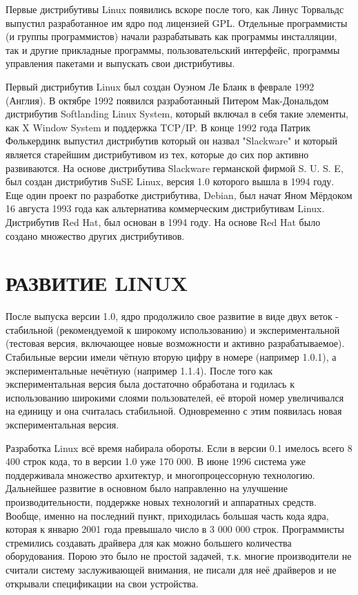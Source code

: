 \documentclass[bachelor, och, referat, times]{SCWorks}
\begin{document}
\par Первые дистрибутивы Linux появились вскоре 
после того, как Линус
Торвальдс выпустил разработанное им ядро под 
лицензией GPL. Отдельные 
программисты (и группы программистов) начали 
разрабатывать как программы 
инсталляции, так и другие прикладные программы, 
пользовательский 
интерфейс, программы управления пакетами и 
выпускать свои дистрибутивы.

\par Первый дистрибутив Linux был создан Оуэном Ле 
Бланк в феврале 1992 
(Англия). В октябре 1992 появился разработанный 
Питером Мак-Дональдом 
дистрибутив Softlanding Linux System, который 
включал в себя такие 
элементы, как X Window System и поддержка TCP/IP. В 
конце 1992 года Патрик
Фолькердинк выпустил дистрибутив который он назвал 
"Slackware" и который 
является старейшим дистрибутивом из тех, которые до 
сих пор активно 
развиваются. На основе дистрибутива Slackware 
германской фирмой S. U. S. 
E, был создан дистрибутив SuSE Linux, версия 1.0 
которого вышла в 1994 
году. Еще один проект по разработке дистрибутива, 
Debian, был начат Яном 
Мёрдоком 16 августа 1993 года как альтернатива 
коммерческим дистрибутивам 
Linux. Дистрибутив Red Hat, был основан в 1994 
году. На основе Red Hat 
было создано множество других дистрибутивов.

\section{РАЗВИТИЕ LINUX}

\par После выпуска версии 1.0, ядро продолжило свое 
развитие в виде двух 
веток - стабильной (рекомендуемой к широкому 
использованию) и 
экспериментальной (тестовая версия, включающее 
новые возможности и активно
разрабатываемое). Стабильные версии имели чётную 
вторую цифру в номере 
(например 1.0.1), а экспериментальные нечётную 
(например 1.1.4). После 
того как экспериментальная версия была достаточно 
обработана и годилась к 
использованию широкими слоями пользователей, её 
второй номер увеличивался 
на единицу и она считалась стабильной. Одновременно 
с этим появилась новая
экспериментальная версия.

\par Разработка Linux всё время набирала обороты. 
Если в версии 0.1 
имелось всего 8 400 строк кода, то в версии 1.0 уже 
170 000. В июне 1996 
система уже поддерживала множество архитектур, и 
многопроцессорную 
технологию. Дальнейшее развитие в основном было 
направленно на улучшение 
производительности, поддержке новых технологий и 
аппаратных средств. 
Вообще, именно на последний пункт, приходилась 
большая часть кода ядра, 
которая к январю 2001 года превышало число в 3 000 
000 строк. Программисты
стремились создавать драйвера для как можно 
большего количества 
оборудования. Порою это было не простой задачей, 
т.к. многие производители
не считали систему заслуживающей внимания, не 
писали для неё драйверов и 
не открывали спецификации на свои устройства.
\end{document}
